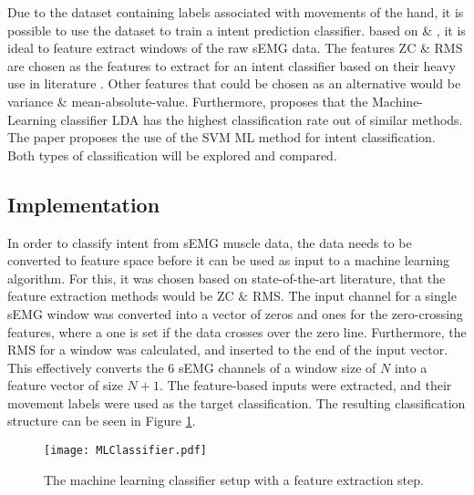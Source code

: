 \documentclass[../main.tex]{subfiles}
\begin{document}
Due to the dataset containing labels associated with movements of the hand, it is possible to use the dataset to train a intent prediction classifier.
based on \cite{Yuki2023} \& \cite{Batzianoulis2018}, it is ideal to feature extract windows of the raw sEMG data.
The features \gls{ZC} \& \gls{RMS} are chosen as the features to extract for an intent classifier based on their heavy use in literature \cite{Tech2015}.
Other features that could be chosen as an alternative would be variance \& mean-absolute-value.
Furthermore, \cite{YanchaoWang2022} proposes that the Machine-Learning classifier LDA has the highest classification rate out of similar methods.
The paper \cite{Batzianoulis2018} proposes the use of the \gls{SVM} \gls{ML} method for intent classification.
Both types of classification will be explored and compared.

\subsection{Implementation}

In order to classify intent from sEMG muscle data, the data needs to be converted to feature space before it can be used as input to a machine learning algorithm.
For this, it was chosen based on state-of-the-art literature, that the feature extraction methods would be \gls{ZC} \& \gls{RMS}.
The input channel for a single sEMG window was converted into a vector of zeros and ones for the zero-crossing features, where a one is set if the data crosses over the zero line.
Furthermore, the RMS for a window was calculated, and inserted to the end of the input vector. This effectively converts the 6 sEMG channels of a window size of $N$ into a feature vector of size $N+1$.
The feature-based inputs were extracted, and their movement labels were used as the target classification.
The resulting classification structure can be seen in Figure \ref{fig:mlclassifier}.

\begin{figure}[H]
\begin{center}
\texttt{[image: MLClassifier.pdf]}
\caption{The machine learning classifier setup with a feature extraction step.}
\label{fig:mlclassifier}
\end{center}
\end{figure}
\end{document}
